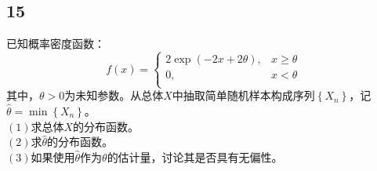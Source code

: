 \documentclass[a4paper,12pt]{article}
\begin{document}
\subsection*{15}\noindent 已知概率密度函数：
\begin{equation*}
	f\left(x\right)=\left\{
	\begin{aligned}
		2\exp\left(-2x+2\theta\right),&x\geq \theta\\
		0,&x<\theta\\
	\end{aligned}
	\right.
\end{equation*}
其中，$\theta>0$为未知参数。从总体$X$中抽取简单随机样本构成序列$\left\{X_{n}\right\}$，记$\hat{\theta}=\min\left\{X_{n}\right\}$。\\
\noindent$\left(1\right)$求总体$X$的分布函数。\\
\noindent$\left(2\right)$求$\hat{\theta}$的分布函数。\\
\noindent$\left(3\right)$如果使用$\hat{\theta}$作为$\theta$的估计量，讨论其是否具有无偏性。
\end{document}
